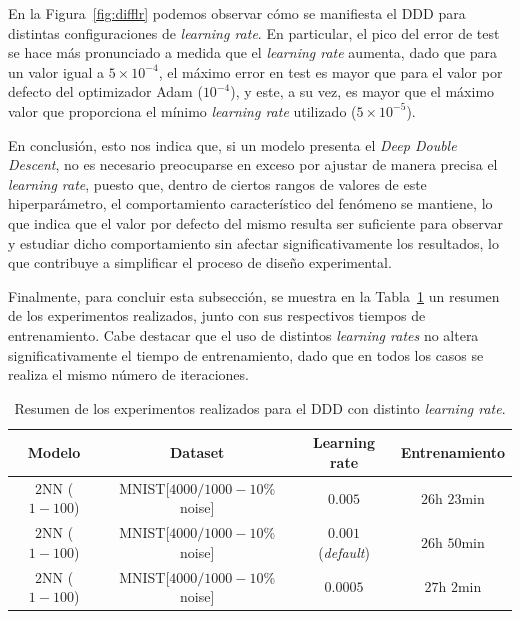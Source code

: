 En la Figura~\ref{fig:difflr} podemos observar cómo se manifiesta el DDD para distintas configuraciones de \textit{learning rate}. En particular, el pico del error de test se hace más pronunciado a medida que el \textit{learning rate} aumenta, dado que para un valor igual a $5 \times 10^{-4}$, el máximo error en test es mayor que para el valor por defecto del optimizador Adam ($10^{-4}$), y este, a su vez, es mayor que el máximo valor que proporciona el mínimo \textit{learning rate} utilizado ($5 \times 10^{-5}$).

En conclusión, esto nos indica que, si un modelo presenta el \textit{Deep Double Descent}, no es necesario preocuparse en exceso por ajustar de manera precisa el \textit{learning rate}, puesto que, dentro de ciertos rangos de valores de este hiperparámetro, el comportamiento característico del fenómeno se mantiene, lo que indica que el valor por defecto del mismo resulta ser suficiente para observar y estudiar dicho comportamiento sin afectar significativamente los resultados, lo que contribuye a simplificar el proceso de diseño experimental.

Finalmente, para concluir esta subsección, se muestra en la Tabla~\ref{tab:difflr} un resumen de los experimentos realizados, junto con sus respectivos tiempos de entrenamiento. Cabe destacar que el uso de distintos \textit{learning rates} no altera significativamente el tiempo de entrenamiento, dado que en todos los casos se realiza el mismo número de iteraciones.

\begin{table}[h!]
    \centering
    \begin{tabular}{|c|c|c|c|}
    \hline
    \textbf{Modelo}       & \textbf{Dataset} & \textbf{Learning rate} & \textbf{Entrenamiento} \\ 
    \hline
    $2$NN ($1-100$)     & MNIST[$4000/1000 - 10$\% noise]      & $0.005$      & $26$h $23$min   \\ 
    $2$NN ($1-100$)     & MNIST[$4000/1000 - 10$\% noise]      & $0.001$ (\textit{default})      & $26$h $50$min     \\ 
    $2$NN ($1-100$)     & MNIST[$4000/1000 - 10$\% noise]      & $0.0005$      & $27$h $2$min         \\ 
    \hline
    \end{tabular}
    \caption[Resumen de los experimentos realizados para el DDD con distinto \textit{learning rate}.]{Resumen de los experimentos realizados para el DDD con distinto \textit{learning rate}.}\label{tab:difflr}
\end{table}

\endinput
